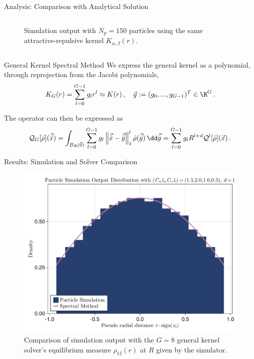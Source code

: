 \documentclass[aspectratio=169, hyperref={colorlinks=true}]{beamer}
\begin{document}
\begin{frame}{Analysis: Comparison with Analytical Solution}
\begin{columns}[t]
\begin{column}{0.4\textwidth}
\begin{figure}[H]
          \caption[Comparison with analytical solutions and error]{Simulation output with $N_p = 150$ particles using the same attractive-repulsive kernel $K_{\alpha,\beta}(r)$.}
        \end{figure}
      \end{column}
    \end{columns}
  \end{frame}

  \begin{frame}{General Kernel Spectral Method}
    We express the general kernel as a polynomial, through reprojection from the Jacobi polynomials,
    \begin{equation}
      K_G(r) = \sum_{l=0}^{G-1} g_l r^l \approx K(r)\,,\quad \vec{g} := ({g}_0, ..., {g}_{G-1})^T \in \R^G\,.
      \label{eq:monomial-expansion}
    \end{equation}

    The operator can then be expressed as
    \begin{equation*}
      \mathcal{Q}_G[\hat{\rho}](\hatvec{x})
      = \int_{B_R(\vec{0})} \sum_{l=0}^{G-1} g_l \norm{\hatvec{x}-\hatvec{y}}^l \hat{\rho}(\hatvec{y}) \,\dd\hatvec{y}
      = \sum_{l=0}^{G-1} g_l R^{l+d} \mathcal{Q}^l[\hat{\rho}](\vec{x})\,.
    \end{equation*}
  \end{frame}

  \begin{frame}{Results: Simulation and Solver Comparison}
    \begin{figure}[H]
      \centering
      \includegraphics[width=0.58\linewidth]{results/morse/simulation-solver-comparison.pdf}
      \caption[Comparison of histogram and spectral method solution]{Comparison of simulation output with the $G = 8$ general kernel solver's equilibrium measure $\rho_{12}(r)$ at $R$ given by the simulator.}
      \label{fig:simulation-solver-comparison}
    \end{figure}
  \end{frame}
\end{document}
